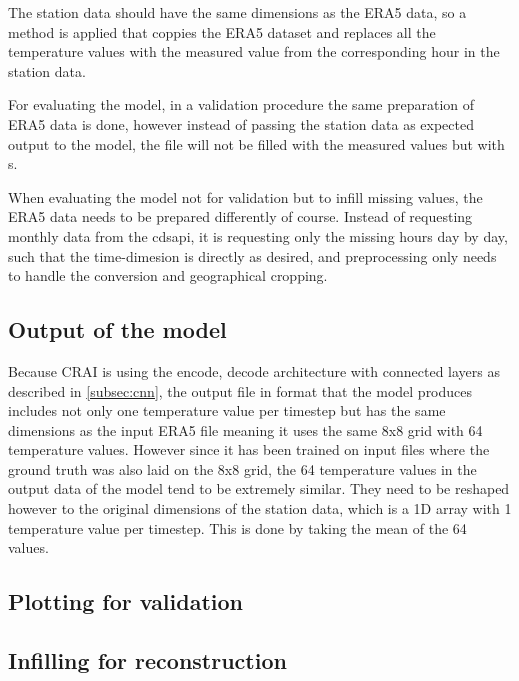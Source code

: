 The station data should have the same dimensions as the ERA5 data, so a method is applied that coppies the ERA5 dataset and replaces all the temperature values with the measured value from the corresponding hour in the station data.

For evaluating the model, in a validation procedure the same preparation of ERA5 data is done, however instead of passing the station data as expected output to the model, the file will not be filled with the measured values but with s.

When evaluating the model not for validation but to infill missing values, the ERA5 data needs to be prepared differently of course. Instead of requesting monthly data from the cdsapi, it is requesting only the missing hours day by day, such that the time-dimesion is directly as desired, and preprocessing only needs to handle the conversion and geographical cropping.

\subsection{Output of the model}

Because CRAI is using the encode, decode architecture with connected layers as described in \autoref{subsec:cnn}, the output file in  format that the model produces includes not only one temperature value per timestep but has the same dimensions as the input ERA5 file meaning it uses the same 8x8 grid with 64 temperature values. However since it has been trained on input files where the ground truth was also laid on the 8x8 grid, the 64 temperature values in the output data of the model tend to be extremely similar. They need to be reshaped however to the original dimensions of the station data, which is a 1D array with 1 temperature value per timestep. This is done by taking the mean of the 64 values. 

\subsection{Plotting for validation}




\subsection{Infilling for reconstruction}

